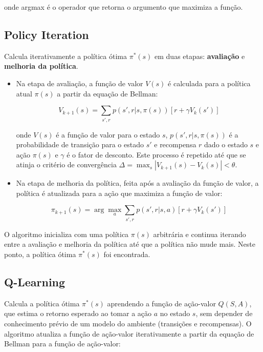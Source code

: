 onde argmax é o operador que retorna o argumento que maximiza a função.

\subsection*{Policy Iteration}
Calcula iterativamente a política ótima $\pi^*(s)$ em duas etapas: \textbf{avaliação} e \textbf{melhoria da política}. 

\begin{itemize}
    \item Na etapa de avaliação, a função de valor $V(s)$ é calculada para a política atual $\pi(s)$ a partir da equação de Bellman:

    \begin{equation}
        V_{k+1}(s) = \sum_{s', r} p(s', r | s, \pi(s)) [r + \gamma V_{k}(s')]
    \end{equation}
    
    onde $V(s)$ é a função de valor para o estado $s$, $p(s', r | s, \pi(s))$ é a probabilidade de transição para o estado $s'$ e recompensa $r$ dado o estado $s$ e ação $\pi(s)$ e $\gamma$ é o fator de desconto. Este processo é repetido até que se atinja o critério de convergência $\Delta = \max_s |V_{k+1}(s) - V_k(s)| < \theta$.

    \item Na etapa de melhoria da política, feita após a avaliação da função de valor, a política é atualizada para a ação que maximiza a função de valor:

    \begin{equation}
        \pi_{k+1}(s) = \arg\max_a \sum_{s', r} p(s', r | s, a) [r + \gamma V_{k}(s')]
    \end{equation}
\end{itemize}

O algoritmo inicializa com uma política $\pi(s)$ arbitrária e continua iterando entre a avaliação e melhoria da política até que a política não mude mais. Neste ponto, a política ótima $\pi^*(s)$ foi encontrada.

\subsection*{Q-Learning}

Calcula a política ótima $\pi^*(s)$ aprendendo a função de ação-valor $Q(S, A)$, que estima o retorno esperado ao tomar a ação $a$ no estado $s$, sem depender de conhecimento prévio de um modelo do ambiente (transições e recompensas). O algoritmo atualiza a função de ação-valor iterativamente a partir da equação de Bellman para a função de ação-valor:

